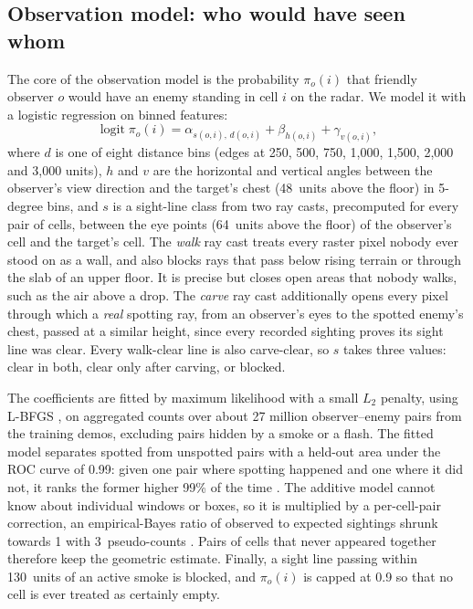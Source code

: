 \documentclass[11pt]{article}
\newcommand{\logit}{\operatorname{logit}}
\newcommand{\1}{\mathbb{1}}
\begin{document}
\subsection{Observation model: who would have seen whom}
\label{sec:spot}
The core of the observation model is the probability $\pi_o(i)$ that friendly observer $o$ would have an enemy standing in cell $i$ on the radar. We model it with a logistic regression \citep{hastie2009elements} on binned features:
\begin{equation}
  \logit \pi_o(i) = \alpha_{s(o,i),\, d(o,i)} + \beta_{h(o,i)} + \gamma_{v(o,i)},
  \label{eq:spot}
\end{equation}
where $d$ is one of eight distance bins (edges at 250, 500, 750, 1{,}000, 1{,}500, 2{,}000 and 3{,}000 units), $h$ and $v$ are the horizontal and vertical angles between the observer's view direction and the target's chest (48~units above the floor) in 5-degree bins, and $s$ is a sight-line class from two ray casts, precomputed for every pair of cells, between the eye points (64~units above the floor) of the observer's cell and the target's cell. The \emph{walk} ray cast treats every raster pixel nobody ever stood on as a wall, and also blocks rays that pass below rising terrain or through the slab of an upper floor. It is precise but closes open areas that nobody walks, such as the air above a drop. The \emph{carve} ray cast additionally opens every pixel through which a \emph{real} spotting ray, from an observer's eyes to the spotted enemy's chest, passed at a similar height, since every recorded sighting proves its sight line was clear. Every walk-clear line is also carve-clear, so $s$ takes three values: clear in both, clear only after carving, or blocked.

The coefficients are fitted by maximum likelihood with a small $L_2$ penalty, using L-BFGS \citep{byrd1995limited}, on aggregated counts over about 27 million observer--enemy pairs from the training demos, excluding pairs hidden by a smoke or a flash. The fitted model separates spotted from unspotted pairs with a held-out area under the ROC curve of 0.99: given one pair where spotting happened and one where it did not, it ranks the former higher 99\% of the time \citep{hanley1982meaning}. The additive model cannot know about individual windows or boxes, so it is multiplied by a per-cell-pair correction, an empirical-Bayes ratio of observed to expected sightings shrunk towards 1 with 3~pseudo-counts \citep{efron1975data}. Pairs of cells that never appeared together therefore keep the geometric estimate. Finally, a sight line passing within 130~units of an active smoke is blocked, and $\pi_o(i)$ is capped at 0.9 so that no cell is ever treated as certainly empty.
\end{document}
